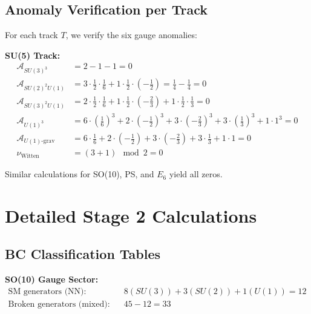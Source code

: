 \documentclass[11pt,a4paper]{article}
\begin{document}
\subsection{Anomaly Verification per Track}
\label{app:anomaly-detail}

For each track $T$, we verify the six gauge anomalies:

\textbf{SU(5) Track:}
\begin{align}
\label{eq:anom-su5-su3}
\mathcal{A}_{SU(3)^3} &= 2 - 1 - 1 = 0 \\
\label{eq:anom-su5-su2u1}
\mathcal{A}_{SU(2)^2U(1)} &= 3 \cdot \tfrac{1}{2} \cdot \tfrac{1}{6} + 1 \cdot \tfrac{1}{2} \cdot (-\tfrac{1}{2}) = \tfrac{1}{4} - \tfrac{1}{4} = 0 \\
\label{eq:anom-su5-su3u1}
\mathcal{A}_{SU(3)^2U(1)} &= 2 \cdot \tfrac{1}{2} \cdot \tfrac{1}{6} + 1 \cdot \tfrac{1}{2} \cdot (-\tfrac{2}{3}) + 1 \cdot \tfrac{1}{2} \cdot \tfrac{1}{3} = 0 \\
\label{eq:anom-su5-u1}
\mathcal{A}_{U(1)^3} &= 6 \cdot (\tfrac{1}{6})^3 + 2 \cdot (-\tfrac{1}{2})^3 + 3 \cdot (-\tfrac{2}{3})^3 + 3 \cdot (\tfrac{1}{3})^3 + 1 \cdot 1^3 = 0 \\
\label{eq:anom-su5-grav}
\mathcal{A}_{U(1)\text{-grav}} &= 6 \cdot \tfrac{1}{6} + 2 \cdot (-\tfrac{1}{2}) + 3 \cdot (-\tfrac{2}{3}) + 3 \cdot \tfrac{1}{3} + 1 \cdot 1 = 0 \\
\label{eq:anom-su5-witten}
\nu_{\text{Witten}} &= (3 + 1) \mod 2 = 0
\end{align}

Similar calculations for SO(10), PS, and $E_6$ yield all zeros.

\section{Detailed Stage 2 Calculations}
\label{app:stage2-detail}

\subsection{BC Classification Tables}
\label{app:bc-tables}

\textbf{SO(10) Gauge Sector:}
\begin{equation}
\label{eq:bc-so10-gauge}
\begin{aligned}
\text{SM generators (NN):} \quad &8 (SU(3)) + 3 (SU(2)) + 1 (U(1)) = 12 \\
\text{Broken generators (mixed):} \quad &45 - 12 = 33
\end{aligned}
\end{equation}
\end{document}
